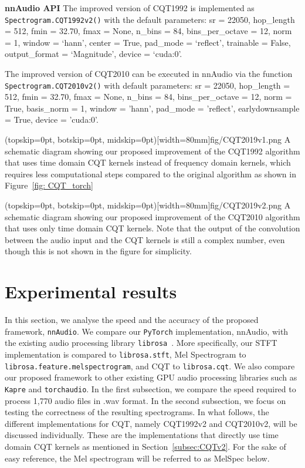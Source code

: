 \documentclass{ieeeaccess}
\newcommand{\nbh}[1]{\texttt{#1}}
\begin{document}
\hspace{11pt} 

\noindent \textbf{nnAudio API} The improved version of CQT1992 is implemented as \nbh{Spectrogram.CQT1992v2()} with the default parameters: sr = 22050, hop\_length = 512, fmin = 32.70, fmax = None, n\_bins = 84, bins\_per\_octave = 12, norm = 1, window = `hann', center = True, pad\_mode = `reflect', trainable = False, output\_format = `Magnitude', device = `cuda:0'. 

The improved version of CQT2010 can be executed in nnAudio via the function \nbh{Spectrogram.CQT2010v2()} with default parameters: sr = 22050, hop\_length = 512, fmin = 32.70, fmax = None, n\_bins = 84, bins\_per\_octave = 12, norm = True, basis\_norm = 1, window = 'hann', pad\_mode = 'reflect', earlydownsample = True, device = 'cuda:0'.

\Figure(topskip=0pt, botskip=0pt, midskip=0pt)[width=80mm]{fig/CQT2019v1.png}
{A schematic diagram showing our proposed improvement of the CQT1992 algorithm that uses time domain CQT kernels instead of frequency domain kernels, which requires less computational steps compared to the original algorithm as shown in Figure~\ref{fig: CQT_torch}\label{fig: CQT2010v1}}

\Figure(topskip=0pt, botskip=0pt, midskip=0pt)[width=80mm]{fig/CQT2019v2.png}
{A schematic diagram showing our proposed improvement of the CQT2010 algorithm that uses only time domain CQT kernels. Note that the output of the convolution between the audio input and the CQT kernels is still a complex number, even though this is not shown in the figure for simplicity. \label{fig: CQT2010v2}}



\section{Experimental results}\label{sec: Result}
In this section, we analyse the speed and the accuracy of the proposed framework, \texttt{nnAudio}. We compare our \nbh{PyTorch} implementation, nnAudio, with the existing audio processing library \nbh{librosa}~\cite{mcfee2015Librosa}. More specifically, our STFT implementation is compared to \nbh{librosa.stft}, Mel Spectrogram to \nbh{librosa.feature.melspectrogram}, and CQT to \nbh{librosa.cqt}. {We also compare our proposed framework to other existing GPU audio processing libraries such as \texttt{Kapre} and \texttt{torchaudio}}. In the first subsection, we compare the speed required to  process 1,770 audio files in .wav format. In the second subsection, we focus on testing the correctness of the resulting spectrograms.  In what follows, the different implementations for CQT,  namely CQT1992v2 and CQT2010v2, will be discussed individually. These are the implementations that directly use time domain CQT kernels as mentioned in Section~\ref{subsec:CQTv2}. For the sake of easy reference, the Mel spectrogram will be referred to as MelSpec below.
\end{document}
